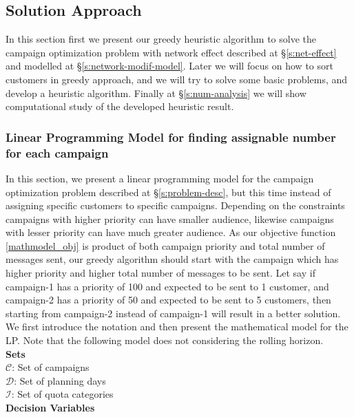 \documentclass[11pt]{article}
\begin{document}
\subsection{Solution Approach}
In this section first we present our greedy heuristic algorithm to solve the campaign optimization problem with network effect described at \S \ref{s:net-effect} and modelled at \S \ref{s:network-modif-model}. Later we will focus on how to sort customers in greedy approach, and we will try to solve some basic problems, and develop a heuristic algorithm. Finally at \S \ref{s:num-analysis} we will show computational study of the developed heuristic  result.

\subsubsection{Linear Programming Model for finding assignable number for each campaign} \label{s:problem-math-lp}

In this section, we present a linear programming model for the campaign optimization problem described at \S \ref{s:problem-desc}, but this time instead of assigning specific customers to specific campaigns. Depending on the constraints campaigns with higher priority can have smaller audience, likewise campaigns with lesser priority can have much greater audience. As our objective function \eqref{mathmodel_obj} is product of both campaign priority and total number of messages sent, our greedy algorithm should start with the campaign which has higher priority and higher total number of messages to be sent. Let say if campaign-1 has a priority of 100 and expected to be sent to 1 customer, and campaign-2 has a priority of 50 and expected to be sent to 5 customers, then starting from campaign-2 instead of campaign-1 will result in a better solution.
\\
We first introduce the notation and then present the mathematical model for the LP. Note that the following model does not considering the rolling horizon.\\

\noindent \textbf{Sets}\\

\noindent ${\mathcal{C}}$: Set of campaigns \\
\noindent ${\mathcal{D}}$: Set of planning days \\
\noindent ${\mathcal{I}}$: Set of quota categories \\

\noindent \textbf{Decision Variables}\\
\end{document}
